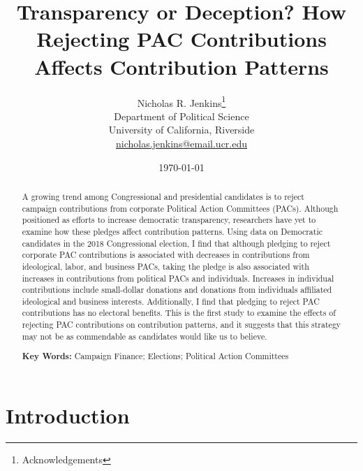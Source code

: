 \documentclass[12pt]{article}
\title{\textbf{Transparency or Deception? How Rejecting PAC Contributions Affects Contribution Patterns}}
\author{Nicholas R. Jenkins\thanks{Acknowledgements} \\ Department of Political Science\\ University of California, Riverside\\ \href{mailto:nicholas.jenkins@email.ucr.edu}{nicholas.jenkins@email.ucr.edu}}
\date{\today}
\begin{document}
\maketitle
\thispagestyle{empty}

\begin{abstract}

A growing trend among Congressional and presidential candidates is to reject campaign contributions from corporate Political Action Committees (PACs). Although positioned as efforts to increase democratic transparency, researchers have yet to examine how these pledges affect contribution patterns. Using data on Democratic candidates in the 2018 Congressional election, I find that although pledging to reject corporate PAC contributions is associated with decreases in contributions from ideological, labor, and business PACs, taking the pledge is also associated with increases in contributions from political PACs and individuals. Increases in individual contributions include small-dollar donations and donations from individuals affiliated ideological and business interests. Additionally, I find that pledging to reject PAC contributions has no electoral benefits. This is the first study to examine the effects of rejecting PAC contributions on contribution patterns, and it suggests that this strategy may not be as commendable as candidates would like us to believe.

\medskip

\noindent \textbf{Key Words:} Campaign Finance; Elections; Political Action Committees

\end{abstract}

\pagebreak

\cleardoublepage
\setcounter{page}{1}

\doublespacing

\section{Introduction} \label{sec: intro}
\end{document}
